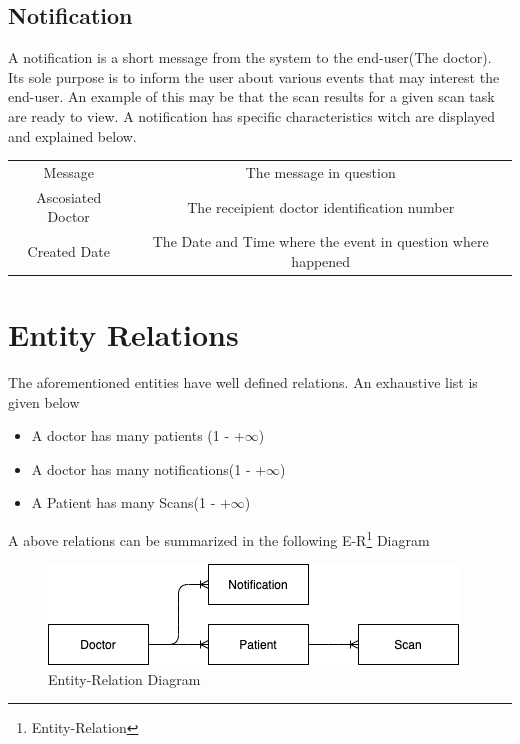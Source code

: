 		\subsection{Notification}
		\label{notification-definition}
		A notification is a short message from the system to the end-user(The doctor). Its sole purpose is to inform the user about
		various events that may interest the end-user. An example of this may be that the scan results for a given scan task are ready 
		to view. A notification has specific characteristics witch are displayed and explained below.
		\begin{center}
			\begin{tabular}{ |c|c| } 
				\hline
				Message & The message in question\\
				Ascosiated Doctor & The receipient doctor identification number \\
				Created Date & The Date and Time where the event in question where happened\\
				\hline
			\end{tabular}
		\end{center}
	\section{Entity Relations}
		The aforementioned entities have well defined relations. An exhaustive list is given below
		\begin{itemize}
			\item A doctor has many patients (1 - +$\infty$)
			\item A doctor has many notifications(1 - +$\infty$)
			\item A Patient has many Scans(1 - +$\infty$)
		\end{itemize}
		A above relations can be summarized in the following E-R\footnote{Entity-Relation} Diagram
		\begin{figure}[H]
			\iftrue
			\centering
			\caption{Entity-Relation Diagram}
			\includegraphics[scale=0.5]{figures/Entity-Relation-Fig}
			\fi
		\end{figure}
	
	
